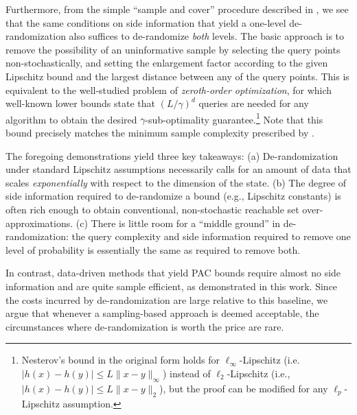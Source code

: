 \documentclass[letterpaper, 10 pt, conference]{ieeeconf}  %
\begin{document}
Furthermore, from the simple ``sample and cover'' procedure described in , we see that the same conditions on side information that yield a one-level de-randomization also suffices to de-randomize \emph{both} levels. The basic approach is to remove the possibility of an uninformative sample by selecting the query points non-stochastically, and setting the enlargement factor according to the given Lipschitz bound and the largest distance between any of the query points.
This is equivalent to the well-studied problem of \emph{zeroth-order optimization}, for which well-known lower bounds 
\cite[e.g., Theorem 1.1.2]{nesterov2018lectures}
state that
$(L/\gamma)^d$ queries are needed for any algorithm to obtain the desired $\gamma$-sub-optimality guarantee.\footnote{Nesterov's bound in the original form holds for $\ell_\infty$-Lipschitz (i.e. $| h(x) - h(y) | \leq L \| x - y \|_\infty$) instead of 
$\ell_2$-Lipschitz (i.e., $| h(x) - h(y) | \leq L \|x - y \|_2$), but the proof can be modified for any $\ell_p$-Lipschitz assumption.} Note that this bound precisely matches
the minimum sample complexity prescribed by .


The foregoing demonstrations yield three key takeaways: (a)  De-randomization under standard Lipschitz assumptions necessarily calls for an amount of data that scales \emph{exponentially} with respect to the dimension of the state. (b) The degree of side information required to de-randomize a bound (e.g., Lipschitz constants) is often rich enough to obtain conventional, non-stochastic reachable set over-approximations. (c) There is little room for a ``middle ground'' in de-randomization: the query complexity and side information required to remove one level of probability
is essentially the same as required to remove both. 

In contrast, data-driven methods that yield PAC bounds require almost no side information and are quite sample efficient, as demonstrated in this work. Since the costs incurred by de-randomization are large relative to this baseline, we argue that whenever a sampling-based approach is deemed acceptable, the circumstances where de-randomization is worth the price are rare.






\end{document}
